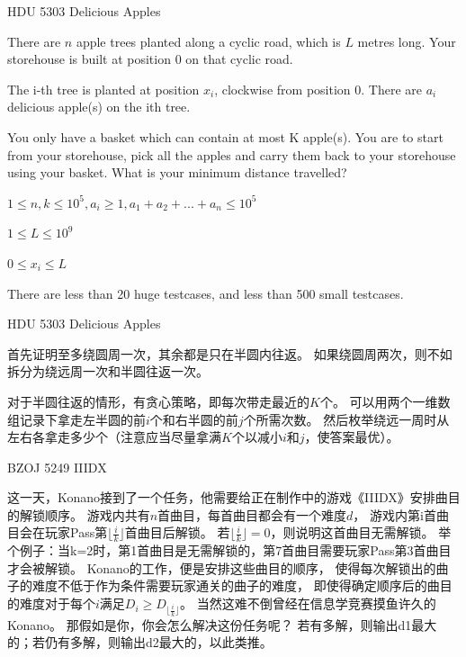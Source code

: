 \documentclass{beamer}
\begin{document}
\begin{frame}{HDU 5303 Delicious Apples}

    There are $n$ apple trees planted along a cyclic road, which is $L$ metres long. Your storehouse is built at position 0 on that cyclic road.
    
    The i-th tree is planted at position $x_i$, clockwise from position 0. There are $a_i$ delicious apple(s) on the ith tree.

    You only have a basket which can contain at most K apple(s). You are to start from your storehouse, pick all the apples and carry them back to your storehouse using your basket. What is your minimum distance travelled?

    $1\leq n,k \leq 10^5 , a_i \geq 1 , a_1+a_2+...+a_n \leq 10^5$
    
    $1\leq L \leq 10^9$
    
    $0\leq x_i \leq L$


    There are less than 20 huge testcases, and less than 500 small testcases.

\end{frame}

\begin{frame}{HDU 5303 Delicious Apples}

   首先证明至多绕圆周一次，其余都是只在半圆内往返。
   如果绕圆周两次，则不如拆分为绕远周一次和半圆往返一次。

   对于半圆往返的情形，有贪心策略，即每次带走最近的$K$个。
   可以用两个一维数组记录下拿走左半圆的前$i$个和右半圆的前$j$个所需次数。
   然后枚举绕远一周时从左右各拿走多少个（注意应当尽量拿满$K$个以减小$i$和$j$，使答案最优）。

\end{frame}

\begin{frame}{BZOJ 5249 IIIDX}

    这一天，Konano接到了一个任务，他需要给正在制作中的游戏《IIIDX》安排曲目的解锁顺序。
    游戏内共有$n$首曲目，每首曲目都会有一个难度$d$，
    游戏内第i首曲目会在玩家Pass第$\lfloor\frac{i}{k}\rfloor$首曲目后解锁。
    若$\lfloor\frac{i}{k}\rfloor=0$，则说明这首曲目无需解锁。
    举个例子：当k=2时，第1首曲目是无需解锁的，第7首曲目需要玩家Pass第3首曲目才会被解锁。
    Konano的工作，便是安排这些曲目的顺序，
    使得每次解锁出的曲子的难度不低于作为条件需要玩家通关的曲子的难度，
    即使得确定顺序后的曲目的难度对于每个$i$满足$D_i\geq D_{\lfloor\frac{i}{k}\rfloor}$。
    当然这难不倒曾经在信息学竞赛摸鱼许久的Konano。
    那假如是你，你会怎么解决这份任务呢？
    若有多解，则输出d1最大的；若仍有多解，则输出d2最大的，以此类推。
    
\end{frame}
\end{document}
